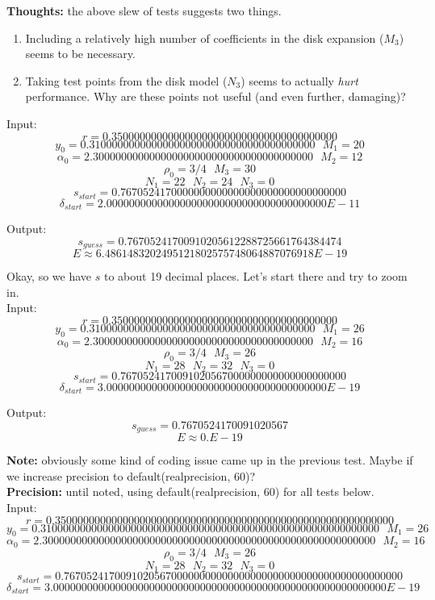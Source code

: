 \documentclass[]{article}
\begin{document}
\textbf{Thoughts:} the above slew of tests suggests two things.
\begin{enumerate}
	\item Including a relatively high number of coefficients in the disk expansion ($M_3$) seems to be necessary.
	\item Taking test points from the disk model ($N_3$) seems to actually \textit{hurt} performance. Why are these points not useful (and even further, damaging)?
\end{enumerate}

Input:
$$
r = 0.3500000000000000000000000000000000000000 $$$$
y_0 = 0.3100000000000000000000000000000000000000 ~~~ M_1 = 20 $$$$
\alpha_0 = 2.300000000000000000000000000000000000000 ~~~ M_2 = 12 $$$$
\rho_0 = 3/4 ~~~ M_3 = 30 $$$$
N_1 = 22 ~~~ N_2 = 24 ~~~ N_3 = 0 $$$$
s_{start} = 0.7670524170000000000000000000000000000000 $$$$
\delta_{start} = 2.000000000000000000000000000000000000000 E-11
$$

Output:
$$
s_{guess} = 0.76705241700910205612288725661764384474 $$$$
E \approx 6.4861483202495121802575748064887076918 E-19
$$

Okay, so we have $s$ to about 19 decimal places. Let's start there and try to zoom in.
\\

Input:
$$
r = 0.3500000000000000000000000000000000000000 $$$$
y_0 = 0.3100000000000000000000000000000000000000 ~~~ M_1 = 26 $$$$
\alpha_0 = 2.300000000000000000000000000000000000000 ~~~ M_2 = 16 $$$$
\rho_0 = 3/4 ~~~ M_3 = 26 $$$$
N_1 = 28 ~~~ N_2 = 32 ~~~ N_3 = 0 $$$$
s_{start} = 0.7670524170091020567000000000000000000000 $$$$
\delta_{start} = 3.000000000000000000000000000000000000000 E-19
$$

Output:
$$
s_{guess} = 0.7670524170091020567 $$$$
E \approx 0.E-19
$$

\textbf{Note:} obviously some kind of coding issue came up in the previous test. Maybe if we increase precision to default(realprecision, 60)?
\\

\textbf{Precision:} until noted, using default(realprecision, 60) for all tests below.
\\

Input:
$$
r = 0.350000000000000000000000000000000000000000000000000000000000 $$$$
y_0 = 0.310000000000000000000000000000000000000000000000000000000000 ~~~ M_1 = 26 $$$$
\alpha_0 = 2.30000000000000000000000000000000000000000000000000000000000 ~~~ M_2 = 16 $$$$
\rho_0 = 3/4 ~~~ M_3 = 26 $$$$
N_1 = 28 ~~~ N_2 = 32 ~~~ N_3 = 0 $$$$
s_{start} = 0.767052417009102056700000000000000000000000000000000000000000 $$$$
\delta_{start} = 3.00000000000000000000000000000000000000000000000000000000000 E-19
$$
\end{document}
